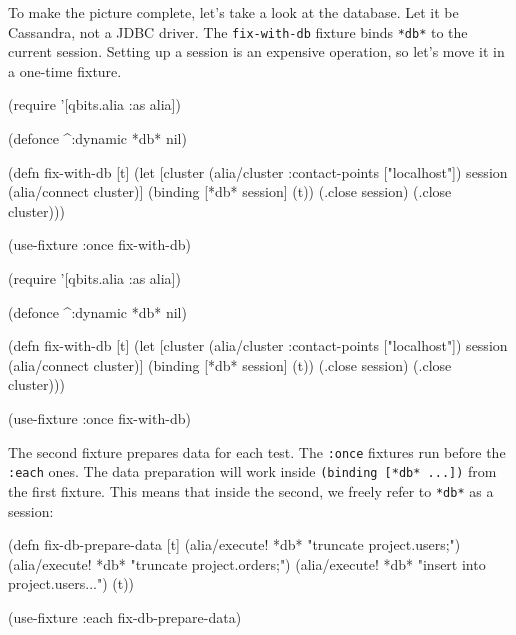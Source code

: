
To make the picture complete, let's take a look at the database. Let it be Cassandra, not a JDBC driver. The \verb|fix-with-db| fixture binds \verb|*db*| to the current session. Setting up a session is an expensive operation, so let's move it in a one-time fixture.

\ifnarrow

\begin{english}
  \begin{clojure}
(require '[qbits.alia :as alia])

(defonce ^:dynamic *db* nil)

(defn fix-with-db [t]
  (let [cluster (alia/cluster
                  {:contact-points
                   ["localhost"]})
        session (alia/connect cluster)]
    (binding [*db* session]
      (t))
    (.close session)
    (.close cluster)))

(use-fixture :once fix-with-db)
  \end{clojure}
\end{english}

\else

\begin{english}
  \begin{clojure}
(require '[qbits.alia :as alia])

(defonce ^:dynamic *db* nil)

(defn fix-with-db [t]
  (let [cluster (alia/cluster {:contact-points ["localhost"]})
        session (alia/connect cluster)]
    (binding [*db* session]
      (t))
    (.close session)
    (.close cluster)))

(use-fixture :once fix-with-db)
  \end{clojure}
\end{english}

\fi

The second fixture prepares data for each test. The \verb|:once| fixtures run before the \verb|:each| ones. The data preparation will work inside \verb|(binding [*db* ...])| from the first fixture. This means that inside the second, we freely refer to \verb|*db*| as a session:


\ifnarrow

\begin{english}
  \begin{clojure}
(defn fix-db-prepare-data [t]
  (alia/execute! *db*
    "truncate project.users;")
  (alia/execute! *db*
    "truncate project.orders;")
  (alia/execute! *db*
    "insert into project.users...")
  (t))

(use-fixture :each fix-db-prepare-data)
  \end{clojure}
\end{english}

